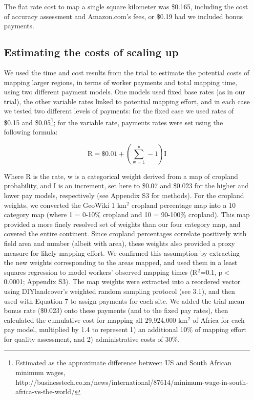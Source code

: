 \documentclass[preprint,12pt,authoryear]{elsarticle}
\begin{document}
The flat rate cost to map a single square kilometer was \$0.165, including the cost of accuracy assessment and Amazon.com's fees, or \$0.19 had we included bonus payments. 


\subsection{Estimating the costs of scaling up}
We used the time and cost results from the trial to estimate the potential costs of mapping larger regions, in terms of worker payments and total mapping time, using two different payment models. One models used fixed base rates (as in our trial), the other variable rates linked to potential mapping effort, and in each case we tested two different levels of payments: for the fixed case we used rates of \$0.15 and \$0.05\footnote{Estimated as the approximate difference between US and South African minimum wages, http://businesstech.co.za/news/international/87614/minimum-wage-in-south-africa-vs-the-world/}; for the variable rate, payments rates were set using the following formula: 

\begin{equation}
\textrm{R} = \$0.01 + (\sum_{\textrm{w}=1}^{\textrm{n}} - 1)\textrm{I}   
\end{equation}

Where R is the rate, w is a categorical weight derived from a map of cropland probability, and I is an increment, set here to \$0.07 and \$0.023 for the higher and lower pay models, respectively (see Appendix S3 for methods).  For the cropland weights, we converted the GeoWiki 1 km$^2$ cropland percentage map \citep{fritz_mapping_2015} into a 10 category map (where 1 = 0-10\% cropland and 10 = 90-100\% cropland). This map provided a more finely resolved set of weights than our four category map, and covered the entire continent. Since cropland percentages correlate positively with field area and number (albeit with area), these weights also provided a proxy measure for likely mapping effort. We confirmed this assumption by extracting the new weights corresponding to the areas mapped, and used them in a least squares regression to model workers' observed mapping times (R$^2$=0.1, p$<$0.0001; Appendix S3). The map weights were extracted into a reordered vector using DIYlandcover's weighted random sampling protocol (see 3.1), and then used with Equation 7 to assign payments for each site. We added the trial mean bonus rate (\$0.023) onto these payments (and to the fixed pay rates), then calculated the cumulative cost for mapping all 29,924,000 km$^2$ of Africa for each pay model, multiplied by 1.4 to represent 1) an additional 10\% of mapping effort for quality assessment, and 2) administrative costs of 30\%. 
\end{document}
